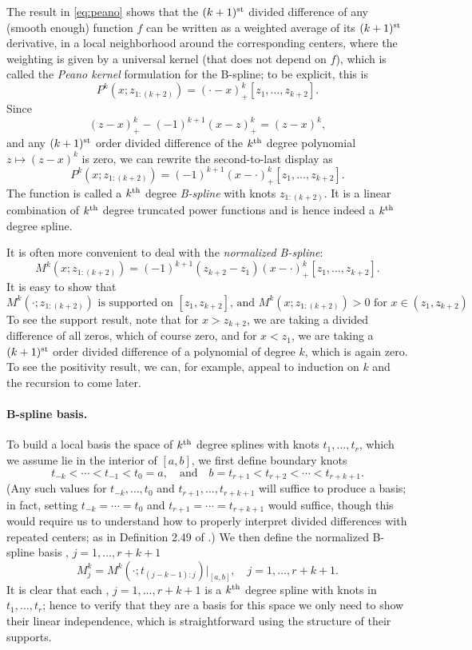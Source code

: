 \documentclass{article}
\begin{document}
The result in \eqref{eq:peano} shows that the $(k+1)^{\text{st}}$ divided difference 
of any (smooth enough) function $f$ can be written as a weighted average of 
its $(k+1)^{\text{st}}$ derivative, in a local neighborhood around the corresponding
centers, where the weighting is given by a universal kernel  (that does not depend on $f$), which is called the \emph{Peano 
  kernel} formulation for the B-spline; to be explicit, this is
\[
P^k(x; z_{1:(k+2)}) = (\cdot - x)^k_+[z_1,\dots,z_{k+2}].
\]
Since 
\[
(z-x)^k_+ - (-1)^{k+1} (x-z)^k_+ =  (z-x)^k,
\]
and any $(k+1)^{\text{st}}$ order divided difference of the $k^{\text{th}}$ degree polynomial $z
\mapsto (z-x)^k$ is zero, we can rewrite the second-to-last display as
\[
P^k(x; z_{1:(k+2)}) = (-1)^{k+1} (x - \cdot)^k_+[z_1,\dots,z_{k+2}].
\]
The function  is called a $k^{\text{th}}$ degree
\emph{B-spline} with knots $z_{1:(k+2)}$. It is a linear combination of $k^{\text{th}}$ 
degree truncated power functions and is hence indeed a $k^{\text{th}}$ degree spline.  

It is often more convenient to deal with the \emph{normalized B-spline}:
\[
M^k(x; z_{1:(k+2)}) = (-1)^{k+1} (z_{k+2}-z_1) 
(x - \cdot)^k_+[z_1,\dots,z_{k+2}]. 
\]
It is easy to show that 
\[
\text{$M^k(\cdot; z_{1:(k+2)})$ is supported on $[z_1,z_{k+2}]$, and  
$M^k(x; z_{1:(k+2)})>0$ for $x \in (z_1,z_{k+2})$}.  
\]
To see the support result, note that for $x > z_{k+2}$, we are taking a divided
difference of all zeros, which of course zero, and for $x < z_1$, we are taking 
a $(k+1)^{\text{st}}$ order divided difference of a polynomial of degree $k$, which is
again zero. To see the positivity result, we can, for example, appeal to 
induction on $k$ and the recursion to come later.

\paragraph{B-spline basis.}  

To build a local basis the space of $k^{\text{th}}$ degree splines with knots
$t_1,\dots,t_r$, which we assume lie in the interior of $[a,b]$, we first define
boundary knots   
\[
t_{-k} < \cdots < t_{-1} < t_0 = a, \quad \text{and} \quad 
b = t_{r+1} < t_{r+2} < \cdots < t_{r+k+1}. 
\]
(Any such values for $t_{-k},\dots,t_0$ and $t_{r+1},\dots,t_{r+k+1}$ will
suffice to produce a basis; in fact, setting $t_{-k}=\cdots=t_0$ and
$t_{r+1}=\cdots=t_{r+k+1}$ would suffice, though this would require us to 
understand how to properly interpret divided differences with repeated centers;
as in Definition 2.49 of \citet{schumaker2007spline}.)  We then define the
normalized B-spline basis , $j=1,\dots,r+k+1$ 
\[
M^k_j = M^k(\cdot ; t_{(j-k-1):j}) \Big|_{[a,b]}, 
\quad j=1,\dots,r+k+1. 
\]
It is clear that each , $j=1,\dots,r+k+1$ is a $k^{\text{th}}$ degree    
spline with knots in $t_1,\dots,t_r$; hence to verify that they are a basis for
this space we only need to show their linear independence, which is
straightforward using the structure of their supports. 
\end{document}
